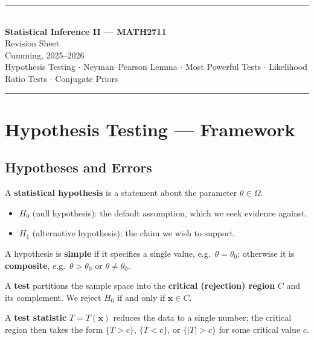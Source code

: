 \documentclass[11pt, a4paper]{article}
\begin{document}
\begin{center}
  {\color{navyblue}\rule{\linewidth}{2pt}}\\[10pt]
  {\LARGE\bfseries\color{navyblue} Statistical Inference II --- MATH2711}\\[4pt]
  {\large\color{darkgray} Revision Sheet}\\[4pt]
  {\small\color{rulegray} Cumming, 2025--2026}\\[6pt]
  {\small\color{darkgray}
    Hypothesis Testing $\cdot$ Neyman--Pearson Lemma $\cdot$
    Most Powerful Tests $\cdot$ Likelihood Ratio Tests $\cdot$ Conjugate Priors}\\[10pt]
  {\color{navyblue}\rule{\linewidth}{2pt}}
\end{center}

\tableofcontents
\vspace{10pt}{\color{rulegray}\hrule}\vspace{10pt}

\newpage
\section{Hypothesis Testing --- Framework}

\subsection*{Hypotheses and Errors}

\begin{defbox}
A \textbf{statistical hypothesis} is a statement about the parameter $\theta \in \Omega$.
\begin{itemize}
  \item $H_0$ (null hypothesis): the default assumption, which we seek evidence against.
  \item $H_1$ (alternative hypothesis): the claim we wish to support.
\end{itemize}
A hypothesis is \textbf{simple} if it specifies a single value, e.g.\ $\theta = \theta_0$; otherwise it is \textbf{composite}, e.g.\ $\theta > \theta_0$ or $\theta \neq \theta_0$.
\end{defbox}

\begin{defbox}
A \textbf{test} partitions the sample space into the \textbf{critical (rejection) region} $C$ and its complement. We reject $H_0$ if and only if $\mathbf{x} \in C$.

A \textbf{test statistic} $T = T(\mathbf{x})$ reduces the data to a single number; the critical region then takes the form $\{T > c\}$, $\{T < c\}$, or $\{|T| > c\}$ for some critical value $c$.
\end{defbox}
\end{document}
